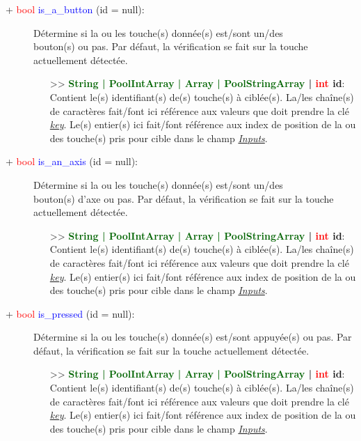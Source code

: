 \documentclass[a4paper, 11pt]{article}
\begin{document}
	\begin{description}
		\item [+ \textcolor{red}{bool} \textcolor{blue}{is\_a\_button} (id = null):] Détermine si la ou les 
		touche(s) donnée(s) est/sont un/des \\bouton(s) ou pas. Par défaut, la vérification se fait sur la 
		touche actuellement détectée.
		\begin{itemize}
			\item [>> \textbf{\textcolor{darkgreen}{String | PoolIntArray | Array | PoolStringArray} |
			\textcolor{red}{int} id}:] Contient le(s) identifiant(s) de(s) touche(s) à ciblée(s). La/les 
			chaîne(s) de caractères fait/font ici référence aux valeurs que doit prendre la clé
			\textit{\hyperlink{key}{key}}. Le(s) entier(s) ici fait/font référence aux index de position de 
			la ou des touche(s) pris pour cible dans le champ \textit{\hyperlink{inputs}{Inputs}}.\\
		\end{itemize}
	\end{description}
	\begin{description}
		\item [+ \textcolor{red}{bool} \textcolor{blue}{is\_an\_axis} (id = null):] Détermine si la ou les 
		touche(s) donnée(s) est/sont un/des \\bouton(s) d'axe ou pas. Par défaut, la vérification se fait 
		sur la touche actuellement détectée.
		\begin{itemize}
			\item [>> \textbf{\textcolor{darkgreen}{String | PoolIntArray | Array | PoolStringArray} |
			\textcolor{red}{int} id}:] Contient le(s) identifiant(s) de(s) touche(s) à ciblée(s). La/les 
			chaîne(s) de caractères fait/font ici référence aux valeurs que doit prendre la clé
			\textit{\hyperlink{key}{key}}. Le(s) entier(s) ici fait/font référence aux index de position de 
			la ou des touche(s) pris pour cible dans le champ \textit{\hyperlink{inputs}{Inputs}}.\\
		\end{itemize}
	\end{description}
	\begin{description}
		\item [+ \textcolor{red}{bool} \textcolor{blue}{is\_pressed} (id = null):] Détermine si la ou les 
		touche(s) donnée(s) est/sont appuyée(s) ou pas. Par défaut, la vérification se fait sur la touche 
		actuellement détectée.
		\begin{itemize}
			\item [>> \textbf{\textcolor{darkgreen}{String | PoolIntArray | Array | PoolStringArray} |
			\textcolor{red}{int} id}:] Contient le(s) identifiant(s) de(s) touche(s) à ciblée(s). La/les 
			chaîne(s) de caractères fait/font ici référence aux valeurs que doit prendre la clé
			\textit{\hyperlink{key}{key}}. Le(s) entier(s) ici fait/font référence aux index de position de 
			la ou des touche(s) pris pour cible dans le champ \textit{\hyperlink{inputs}{Inputs}}.
		\end{itemize}
	\end{description}
\end{document}
